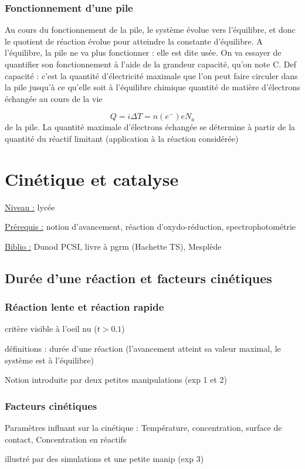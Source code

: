 \documentclass{article}%
\begin{document}
\subsubsection{Fonctionnement d'une pile}
Au cours du fonctionnement de la pile, le système évolue vers l’équilibre, et donc le quotient de
réaction évolue pour atteindre la constante d’équilibre. A l’équilibre, la pile ne va plus fonctionner :
elle est dite usée. On va essayer de quantifier son fonctionnement à l’aide de la grandeur capacité,
qu’on note C.
Def capacité : c’est la quantité d’électricité maximale que l’on peut faire circuler dans la pile
jusqu’à ce qu’elle soit à l’équilibre chimique
quantité de matière d’électrons échangée au cours de la vie

\[Q=i\Delta T= n(e^{-})e N_a\]
de la pile. La quantité maximale d’électrons échangée se détermine à partir de la quantité du réactif
limitant (application à la réaction considérée)

\section{Cinétique et catalyse}
\underline{Niveau :} lycée

\underline{Prérequis :} notion d'avancement, réaction d'oxydo-réduction, spectrophotométrie

\underline{Biblio :} Dunod PCSI, livre à pgrm (Hachette TS), Mesplède 

\subsection{Durée d'une réaction et facteurs cinétiques}
\subsubsection{Réaction lente et réaction rapide}
critère visible à l'oeil nu ($t>0.1$)

définitions : durée d’une réaction (l’avancement atteint sa valeur maximal, le système est à
l’équilibre)

Notion introduite par deux petites manipulations (exp 1 et 2)
\subsubsection{Facteurs cinétiques}

Paramètres influant sur la cinétique :
Température, concentration, surface de contact, Concentration en réactifs

illustré par des simulations et une petite manip (exp 3)
\end{document}
